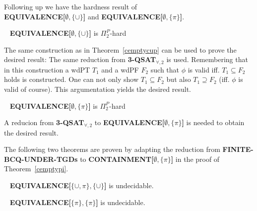 Following up we have the hardness result of\\
\textbf{EQUIVALENCE[$\emptyset,\{\cup\}$]} and
\textbf{EQUIVALENCE[$\emptyset,\{\pi\}$]}.
\begin{theorem}~\cite{pichler2014containment}
	\textbf{EQUIVALENCE[$\emptyset,\{\cup\}$]} is $\Pi_2^P$-hard
\end{theorem}
\begin{proofidea}
The same construction as in Theorem~\ref{cemptycup} can be used to prove the
desired result: The same reduction from \textbf{3-QSAT$_{\forall,2}$} is used.
Remembering that in this construction a wdPT $T_1$ and a wdPF $F_2$ such that
$\phi$ is valid iff.  $T_1 \subseteq F_2$ holds is constructed.
One can not only show $T_1 \subseteq F_2$ but also $T_1 \supseteq F_2$ (iff. $\phi$ is
valid of course). This
argumentation yields the desired result.
\end{proofidea}

\begin{theorem}~\cite{pichler2014containment}
	\textbf{EQUIVALENCE[$\emptyset,\{\pi\}$]} is $\Pi_2^P$-hard
\end{theorem}
\begin{proofidea}
	A reducion from \textbf{3-QSAT$_{\forall,2}$} to
	\textbf{EQUIVALENCE[$\emptyset,\{\pi\}$]}
is needed to obtain the desired result.
\end{proofidea}

The following two theorems are proven by adapting the reduction from
\textbf{FINITE-BCQ-UNDER-TGDs} to \textbf{CONTAINMENT[$\emptyset,\{\pi\}$]} in the proof of 
Theorem~\ref{cemptypi}.
\begin{theorem}~\cite{pichler2014containment}
	\textbf{EQUIVALENCE[$\{\cup,\pi\},\{\cup\}$]} is undecidable.
\end{theorem}
\begin{theorem}~\cite{pichler2014containment}
	\textbf{EQUIVALENCE[$\{\pi\},\{\pi\}$]} is undecidable.
\end{theorem}
